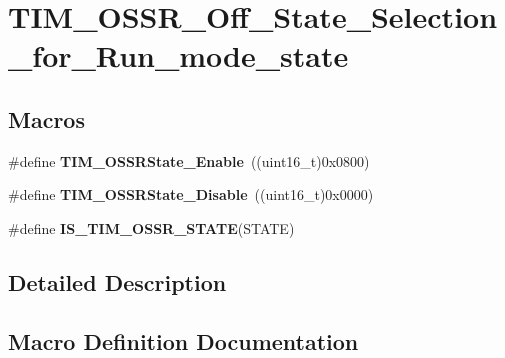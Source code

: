 \hypertarget{group___t_i_m___o_s_s_r___off___state___selection__for___run__mode__state}{}\section{T\+I\+M\+\_\+\+O\+S\+S\+R\+\_\+\+Off\+\_\+\+State\+\_\+\+Selection\+\_\+for\+\_\+\+Run\+\_\+mode\+\_\+state}
\label{group___t_i_m___o_s_s_r___off___state___selection__for___run__mode__state}
\subsection*{Macros}
\begin{DoxyCompactItemize}
\item 
\hypertarget{group___t_i_m___o_s_s_r___off___state___selection__for___run__mode__state_ga3703ba6189db045bec48c864289f997e}{}\#define {\bfseries T\+I\+M\+\_\+\+O\+S\+S\+R\+State\+\_\+\+Enable}~((uint16\+\_\+t)0x0800)\label{group___t_i_m___o_s_s_r___off___state___selection__for___run__mode__state_ga3703ba6189db045bec48c864289f997e}

\item 
\hypertarget{group___t_i_m___o_s_s_r___off___state___selection__for___run__mode__state_ga766dfd8b3c32ec1b8b446f0e2dbe7b97}{}\#define {\bfseries T\+I\+M\+\_\+\+O\+S\+S\+R\+State\+\_\+\+Disable}~((uint16\+\_\+t)0x0000)\label{group___t_i_m___o_s_s_r___off___state___selection__for___run__mode__state_ga766dfd8b3c32ec1b8b446f0e2dbe7b97}

\item 
\#define {\bfseries I\+S\+\_\+\+T\+I\+M\+\_\+\+O\+S\+S\+R\+\_\+\+S\+T\+A\+T\+E}(S\+T\+A\+T\+E)
\end{DoxyCompactItemize}


\subsection{Detailed Description}


\subsection{Macro Definition Documentation}
\hypertarget{group___t_i_m___o_s_s_r___off___state___selection__for___run__mode__state_ga48b4f15f6346e28087edbb9af2ba4f63}{}
